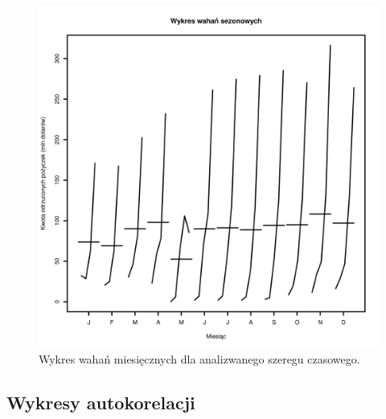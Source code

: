\documentclass[11pt]{article}
\begin{document}
\begin{figure}[h]

    \centering
	\includegraphics[width=\textwidth]{images/data_monthly_train_miesieczny_ogolny.png}
    \caption{Wykres wahań miesięcznych dla analizwanego szeregu czasowego.}
    \label{fig:data_monthly_train_miesieczny_ogolny}

\end{figure}

\newpage

\subsection{Wykresy autokorelacji}
\end{document}
